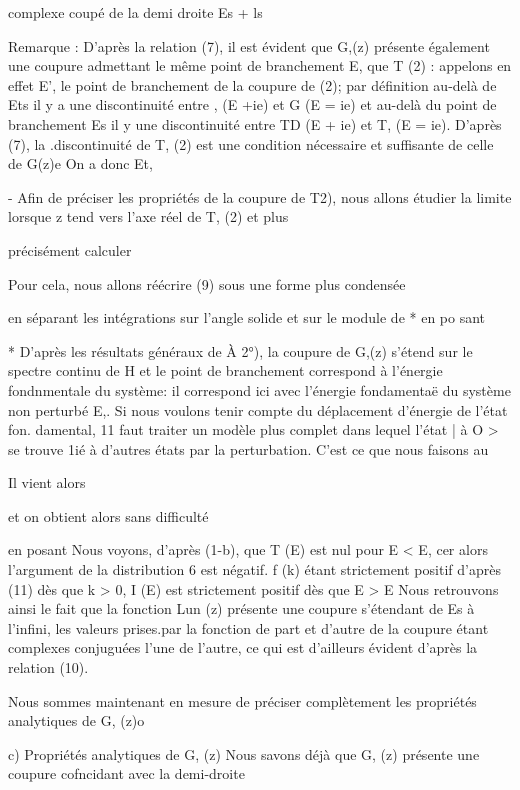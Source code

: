 complexe coupé de la demi droite Es + ls


Remarque : D'après la relation (7), il est évident que G,(z) présente également
une coupure admettant le même point de branchement E, que T (2) : appelons
en effet E', le point de branchement de la coupure de (2); par définition
au-delà de Ets il y a une discontinuité entre , (E +ie) et G (E = ie) et
au-delà du point de branchement Es il y  une discontinuité entre
TD (E + ie) et T, (E = ie). D'après (7), la .discontinuité de T, (2) est une
condition nécessaire et suffisante de celle de G(z)e On a donc
Et,

- Afin de préciser les propriétés de la coupure de T2),
nous allons étudier la limite lorsque z tend vers l'axe réel de T, (2) et plus

précisément calculer

Pour cela, nous allons réécrire (9) sous une forme plus condensée

en séparant les intégrations sur l'angle solide et sur le module de * en po
sant

* D'après les résultats généraux de  À 2°), la coupure de G,(z) s'étend sur le
spectre continu de H et le point de branchement correspond à l'énergie fondnmentale du système: il correspond ici avec l'énergie fondamentaë du système non
perturbé E,. Si nous voulons tenir compte du déplacement d'énergie de l'état fon.
damental, 11 faut traiter un modèle plus complet dans lequel l'état | à O > se
trouve 1ié à d'autres états par la perturbation. C'est ce que nous faisons au

Il vient alors

et on obtient alors sans difficulté

en posant
Nous voyons, d'après (1-b), que T (E) est nul pour E < E, cer
alors l'argument de la distribution 6 est négatif. f (k) étant strictement
positif d'après (11) dès que k > 0, I (E) est strictement positif dès que
E > E Nous retrouvons ainsi le fait que la fonction Lun (z) présente une
coupure s'étendant de Es à l'infini, les valeurs prises.par la fonction de
part et d'autre de la coupure étant complexes conjuguées l'une de l'autre,
ce qui est d'ailleurs évident d'après la relation (10).

Nous sommes maintenant en mesure de préciser complètement les
propriétés analytiques de G, (z)o

c) Propriétés analytiques de G, (z)
Nous savons déjà que G, (z) présente une coupure cofncidant
avec la demi-droite 

